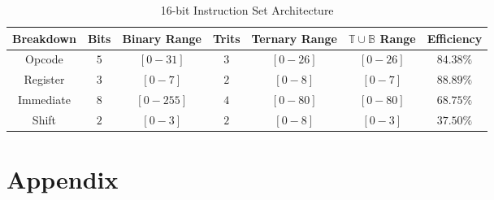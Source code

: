\documentclass[12pt]{article}
\begin{document}
\begin{table}[h]
    \begin{tabular}{|c|c|c|c|c|c|c|}
    \hline
    Breakdown & Bits & Binary Range & Trits & Ternary Range & $\mathbb{T} \cup \mathbb{B}$ Range & Efficiency \\
    \hline
    Opcode & $5$ & $[0-31]$ & $3$ & $[0-26]$ & $[0-26]$ & $84.38\%$ \\
    Register & $3$ & $[0-7]$ & $2$ & $[0-8]$ & $[0-7]$ & $88.89\%$ \\
    Immediate & $8$ & $[0-255]$ & $4$ & $[0-80]$ & $[0-80]$ & $68.75\%$ \\
    Shift & $2$ & $[0-3]$ & $2$ & $[0-8]$ & $[0-3]$ & $37.50\%$ \\
    \hline
    \end{tabular}
    \caption{16-bit Instruction Set Architecture}
\end{table}

\newpage




\newpage

\section{Appendix}

\begin{center}
    \begin{ganttchart}{1}{16}
       \\
       \\
     \\
     \ganttnewline
     \ganttnewline
     \ganttnewline
     \ganttnewline
     \ganttnewline
    \end{ganttchart}
\end{center}
\end{document}
